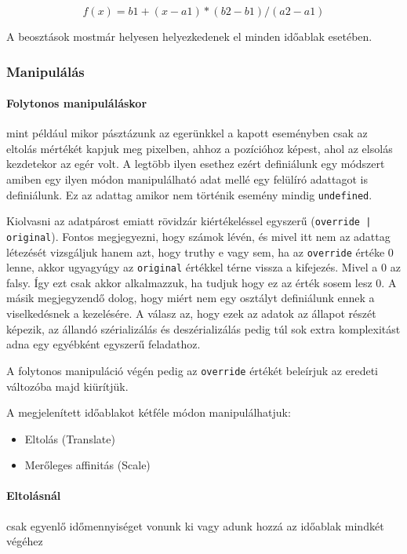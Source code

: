 $$ f(x) = b1 + ( x - a1 ) * ( b2 - b1 ) / ( a2 - a1 )$$

A beosztások mostmár helyesen helyezkedenek el minden időablak esetében.

\subsubsection{Manipulálás}

\paragraph{Folytonos manipuláláskor} mint például mikor pásztázunk az egerünkkel a kapott eseményben csak az eltolás mértékét kapjuk meg pixelben, ahhoz a pozícióhoz képest, ahol az elsolás kezdetekor az egér volt. A legtöbb ilyen esethez ezért definiálunk egy módszert amiben egy ilyen módon manipulálható adat mellé egy felülíró adattagot is definiálunk. Ez az adattag amikor nem történik esemény mindig \lstinline[columns=fixed]{undefined}.

Kiolvasni az adatpárost emiatt rövidzár kiértékeléssel egyszerű (\lstinline[columns=fixed]{override | original}). Fontos megjegyezni, hogy számok lévén, és mivel itt nem az adattag létezését vizsgáljuk hanem azt, hogy truthy e vagy sem, ha az \lstinline[columns=fixed]{override} értéke $0$ lenne, akkor ugyagyúgy az \lstinline[columns=fixed]{original} értékkel térne vissza a kifejezés. Mivel a $0$ az falsy. Így ezt csak akkor alkalmazzuk, ha tudjuk hogy ez az érték sosem lesz $0$. A másik megjegyzendő dolog, hogy miért nem egy osztályt definiálunk ennek a viselkedésnek a kezelésére. A válasz az, hogy ezek az adatok az állapot részét képezik, az állandó szérializálás és deszérializálás pedig túl sok extra komplexitást adna egy egyébként egyszerű feladathoz.

A folytonos manipuláció végén pedig az \lstinline[columns=fixed]{override} értékét beleírjuk az eredeti változóba majd kiürítjük.


A megjelenített időablakot kétféle módon manipulálhatjuk:

\begin{itemize}
	\item Eltolás (Translate)
	\item Merőleges affinitás (Scale)
\end{itemize}

\paragraph{Eltolásnál} csak egyenlő időmennyiséget vonunk ki vagy adunk hozzá az időablak mindkét végéhez

